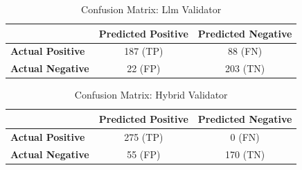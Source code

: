 \begin{table}[h]
\centering
\caption{Confusion Matrix: Llm Validator}
\label{tab:confusion-llm}
\begin{tabular}{lcc}
\hline
 & \textbf{Predicted Positive} & \textbf{Predicted Negative} \\
\hline
\textbf{Actual Positive} & 187 (TP) & 88 (FN) \\
\textbf{Actual Negative} & 22 (FP) & 203 (TN) \\
\hline
\end{tabular}
\end{table}


\begin{table}[h]
\centering
\caption{Confusion Matrix: Hybrid Validator}
\label{tab:confusion-hybrid}
\begin{tabular}{lcc}
\hline
 & \textbf{Predicted Positive} & \textbf{Predicted Negative} \\
\hline
\textbf{Actual Positive} & 275 (TP) & 0 (FN) \\
\textbf{Actual Negative} & 55 (FP) & 170 (TN) \\
\hline
\end{tabular}
\end{table}
